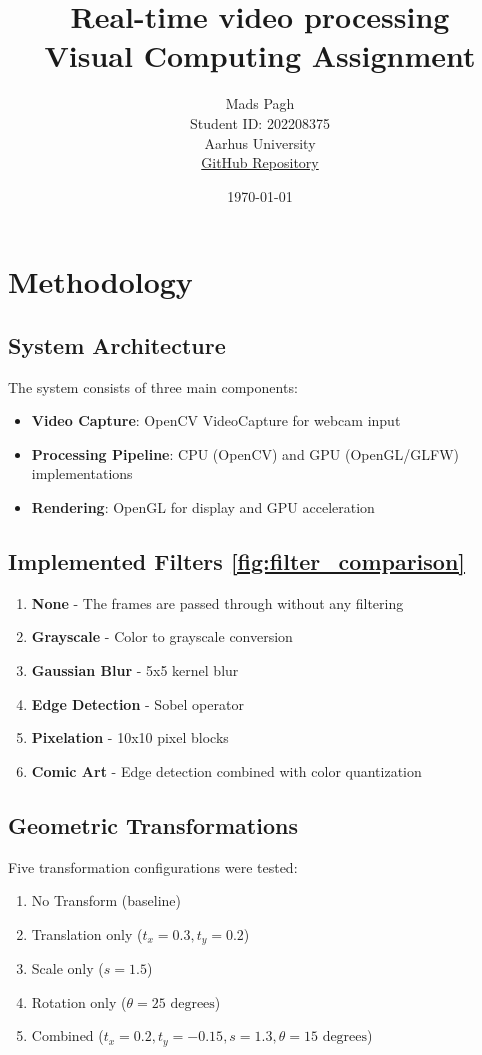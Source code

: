 \documentclass[12pt,a4paper]{article}
\title{Real-time video processing\\
\large Visual Computing Assignment}
\author{Mads Pagh\\
Student ID: 202208375\\
Aarhus University\\
\href{https://github.com/Zyzzava/Live-Camera-Streaming-and-Image-Filters-in-OpenCV}{GitHub Repository}}
\date{\today}
\begin{document}
\maketitle
\newpage

\tableofcontents
\newpage

\section{Methodology}

\subsection{System Architecture}
The system consists of three main components:
\begin{itemize}
    \item \textbf{Video Capture}: OpenCV VideoCapture for webcam input
    \item \textbf{Processing Pipeline}: CPU (OpenCV) and GPU (OpenGL/GLFW) implementations
    \item \textbf{Rendering}: OpenGL for display and GPU acceleration
\end{itemize}


\subsection{Implemented Filters \ref{fig:filter_comparison}}
\begin{enumerate}
    \item \textbf{None} - The frames are passed through without any filtering
    \item \textbf{Grayscale} - Color to grayscale conversion
    \item \textbf{Gaussian Blur} - 5x5 kernel blur
    \item \textbf{Edge Detection} - Sobel operator
    \item \textbf{Pixelation} - 10x10 pixel blocks
    \item \textbf{Comic Art} - Edge detection combined with color quantization
\end{enumerate} 

\subsection{Geometric Transformations}
Five transformation configurations were tested:
\begin{enumerate}
    \item No Transform (baseline)
    \item Translation only ($t_x = 0.3, t_y = 0.2$)
    \item Scale only ($s = 1.5$)
    \item Rotation only ($\theta = 25 \text{ degrees}$)
    \item Combined ($t_x = 0.2, t_y = -0.15, s = 1.3, \theta = 15 \text{ degrees}$)
\end{enumerate}
\end{document}
